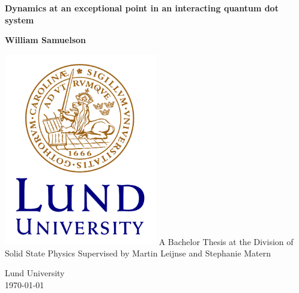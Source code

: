 \documentclass[../main.tex]{subfiles}
\begin{document}
\begin{titlepage}
    \begin{center}
        \vspace*{1cm}
            
        \Huge
        \textbf{Dynamics at an exceptional point in an interacting quantum dot system}
            
        \LARGE
            
        \vspace{1.5cm}
            
        \textbf{William Samuelson}
            
        \vfill

        \includegraphics[width=0.5\textwidth]{figures/LundUniversity_C2line_RGB.png}
        \vfill
        A Bachelor Thesis at the Division of \\
        Solid State Physics
        \vfill            
        \Large
        Supervised by Martin Leijnse and Stephanie Matern\\
        \vfill
        
        Lund University\\
        \today
            
    \end{center}
\end{titlepage}
\end{document}
